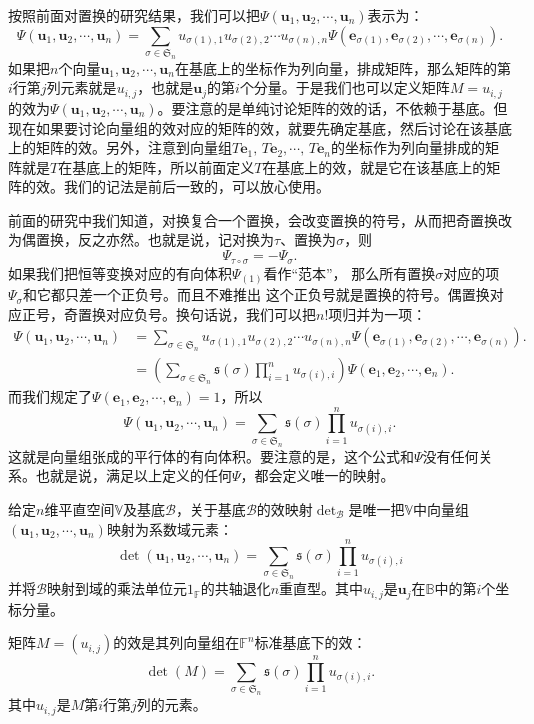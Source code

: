 \documentclass[12pt,UTF8]{ctexbook}
\begin{document}
按照前面对置换的研究结果，我们可以把$\varPsi(\mathbf{u}_1, \mathbf{u}_2,\cdots,\mathbf{u}_n)$表示为：
$$
\varPsi(\mathbf{u}_1, \mathbf{u}_2,\cdots,\mathbf{u}_n) = \sum_{\sigma\in\mathfrak{S}_n} u_{\sigma(1),1}u_{\sigma(2),2}\cdots u_{\sigma(n),n}\varPsi(\mathbf{e}_{\sigma(1)}, \mathbf{e}_{\sigma(2)},\cdots,\mathbf{e}_{\sigma(n)}).
$$
如果把$n$个向量$\mathbf{u}_1, \mathbf{u}_2,\cdots,\mathbf{u}_n$在基底上的坐标作为列向量，排成矩阵，那么矩阵的第$i$行第$j$列元素就是$u_{i,j}$，也就是$\mathbf{u}_j$的第$i$个分量。于是我们也可以定义矩阵$M = u_{i,j}$的效为$\varPsi(\mathbf{u}_1, \mathbf{u}_2,\cdots,\mathbf{u}_n)$。要注意的是单纯讨论矩阵的效的话，不依赖于基底。但现在如果要讨论向量组的效对应的矩阵的效，就要先确定基底，然后讨论在该基底上的矩阵的效。另外，注意到向量组$T\mathbf{e}_1, \,T\mathbf{e}_2,\cdots,\,T\mathbf{e}_n$的坐标作为列向量排成的矩阵就是$T$在基底上的矩阵，所以前面定义$T$在基底上的效，就是它在该基底上的矩阵的效。我们的记法是前后一致的，可以放心使用。

前面的研究中我们知道，对换复合一个置换，会改变置换的符号，从而把奇置换改为偶置换，反之亦然。也就是说，记对换为$\tau$、置换为$\sigma$，则
$$\varPsi_{\tau\circ\sigma} = -\varPsi_{\sigma}.$$
如果我们把恒等变换对应的有向体积$\varPsi_{(1)}$看作“范本”，
那么所有置换$\sigma$对应的项$\varPsi_{\sigma}$和它都只差一个正负号。而且不难推出
这个正负号就是置换的符号。偶置换对应正号，奇置换对应负号。换句话说，我们可以把$n!$项归并为一项：
\begin{align*}
    \varPsi(\mathbf{u}_1, \mathbf{u}_2,\cdots,\mathbf{u}_n) &= \sum_{\sigma\in\mathfrak{S}_n} u_{\sigma(1),1}u_{\sigma(2),2}\cdots u_{\sigma(n),n} \varPsi\left(\mathbf{e}_{\sigma(1)}, \mathbf{e}_{\sigma(2)}, \cdots, \mathbf{e}_{\sigma(n)}\right).  \\
    &= \left(\sum_{\sigma\in\mathfrak{S}_n} \mathfrak{s}(\sigma) \prod_{i=1}^n u_{\sigma(i),i} \right) \varPsi\left(\mathbf{e}_{1}, \mathbf{e}_{2}, \cdots, \mathbf{e}_{n}\right).  
\end{align*}
而我们规定了$\varPsi\left(\mathbf{e}_{1}, \mathbf{e}_{2}, \cdots, \mathbf{e}_{n}\right) = 1$，所以
$$ 
\varPsi(\mathbf{u}_1, \mathbf{u}_2,\cdots,\mathbf{u}_n) = \sum_{\sigma\in\mathfrak{S}_n} \mathfrak{s}(\sigma) \prod_{i=1}^n u_{\sigma(i),i} .
$$
这就是向量组张成的平行体的有向体积。要注意的是，这个公式和$\varPsi$没有任何关系。也就是说，满足以上定义的任何$\varPsi$，都会定义唯一的映射。
\begin{df}\label{df:10_3}
给定$n$维平直空间$\mathbb{V}$及基底$\mathcal{B}$，关于基底$\mathcal{B}$的效映射$\det_\mathcal{B}$是唯一把$\mathbb{V}$中向量组$(\mathbf{u}_1, \mathbf{u}_2,\cdots,\mathbf{u}_n)$映射为系数域元素：
$$
\det(\mathbf{u}_1, \mathbf{u}_2,\cdots,\mathbf{u}_n) = \sum_{\sigma\in\mathfrak{S}_n} \mathfrak{s}(\sigma) \prod_{i=1}^n u_{\sigma(i),i}
$$
并将$\mathcal{B}$映射到域的乘法单位元$1_{\mathbb{F}}$的共轴退化$n$重直型。其中$u_{i,j}$是$\mathbf{u}_j$在$\mathbb{B}$中的第$i$个坐标分量。

矩阵$M = (u_{i,j})$的效是其列向量组在$\mathbb{F}^n$标准基底下的效：
$$
\det(M) = \sum_{\sigma\in\mathfrak{S}_n} \mathfrak{s}(\sigma) \prod_{i=1}^n u_{\sigma(i),i}.
$$
其中$u_{i,j}$是$M$第$i$行第$j$列的元素。
\end{df}
\end{document}

